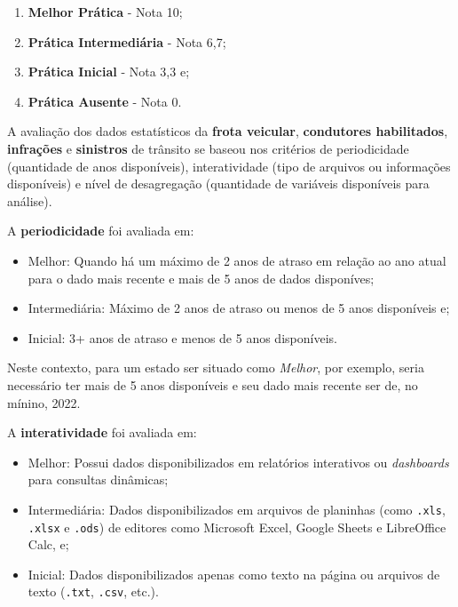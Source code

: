 \documentclass[
  a4paper,
]{article}
\begin{document}
\begin{enumerate}
\def\labelenumi{\arabic{enumi}.}
\item
  \textbf{Melhor Prática} - Nota 10;
\item
  \textbf{Prática Intermediária} - Nota 6,7;
\item
  \textbf{Prática Inicial} - Nota 3,3 e;
\item
  \textbf{Prática Ausente} - Nota 0.
\end{enumerate}

A avaliação dos dados estatísticos da \textbf{frota veicular},
\textbf{condutores habilitados}, \textbf{infrações} e \textbf{sinistros}
de trânsito se baseou nos critérios de periodicidade (quantidade de anos
disponíveis), interatividade (tipo de arquivos ou informações
disponíveis) e nível de desagregação (quantidade de variáveis
disponíveis para análise).

\break

A \textbf{periodicidade} foi avaliada em:

\begin{itemize}
\item
  Melhor: Quando há um máximo de 2 anos de atraso em relação ao ano
  atual para o dado mais recente e mais de 5 anos de dados disponíves;
\item
  Intermediária: Máximo de 2 anos de atraso ou menos de 5 anos
  disponíveis e;
\item
  Inicial: 3+ anos de atraso e menos de 5 anos disponíveis.
\end{itemize}

Neste contexto, para um estado ser situado como \emph{Melhor}, por
exemplo, seria necessário ter mais de 5 anos disponíveis e seu dado mais
recente ser de, no mínino, 2022.

A \textbf{interatividade} foi avaliada em:

\begin{itemize}
\item
  Melhor: Possui dados disponibilizados em relatórios interativos ou
  \emph{dashboards} para consultas dinâmicas;
\item
  Intermediária: Dados disponibilizados em arquivos de planinhas (como
  \texttt{.xls}, \texttt{.xlsx} e \texttt{.ods}) de editores como
  Microsoft Excel, Google Sheets e LibreOffice Calc, e;
\item
  Inicial: Dados disponibilizados apenas como texto na página ou
  arquivos de texto (\texttt{.txt}, \texttt{.csv}, etc.).
\end{itemize}
\end{document}
